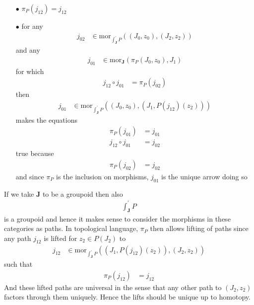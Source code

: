 \begin{enumerate}
\item[$\bullet$]
$\pi_{P}(j_{12}) = j_{12}$
\item[$\bullet$]
for any
\begin{align*}
  j_{02}
  &\in
  \mathrm{mor}_{\int_{\mathbf{J}}^{\prime}P}
  \left(
    (J_{0},z_{0}),
    (J_{2},z_{2})
  \right)
\end{align*}
and any
\begin{align*}
  j_{01}
  &\in
  \mathrm{mor}_{\mathbf{J}}
  \left(
    \pi_{P}(J_{0},z_{0}),
    J_{1}
  \right)
\end{align*}
for which
\begin{align*}
  j_{12}
  \circ
  j_{01}
  &=
  \pi_{P}(j_{02})
\end{align*}
then
\begin{align*}
  j_{01}
  &\in
  \mathrm{mor}_{\int_{\mathbf{J}}^{\prime}P}
  \left(
    (J_{0},z_{0}),
    (J_{1},P(j_{12})(z_{2}))
  \right)
\end{align*}
makes the equations
\begin{align*}
  \pi_{P}(j_{01})
  &=
  j_{01}
  \\
  j_{12}
  \circ
  j_{01}
  &=
  j_{02}
\end{align*}
true because
\begin{align*}
  \pi_{P}(j_{02})
  &=
  j_{02}
\end{align*}
and since $\pi_{P}$ is the inclusion on morphisms, $j_{01}$ is the unique arrow doing so
\end{enumerate}
If we take $\mathbf{J}$ to be a groupoid then also
\begin{align*}
  \int_{\mathbf{J}}^{\prime}
  P
\end{align*}
is a groupoid and hence it makes sense to consider the morphisms in these categories as paths. In topological language, $\pi_{P}$ then allows lifting of paths since any path $j_{12}$ is {\glqq}lifted{\grqq} for $z_{2} \in P(J_{2})$ to
\begin{align*}
  j_{12}
  &\in
  \mathrm{mor}_{\int_{\mathbf{J}}^{\prime}P}
  \left(
    \left(
      J_{1},
      P(j_{12})(z_{2})
    \right),
    (J_{2},z_{2})
  \right)
\end{align*}
such that
\begin{align*}
  \pi_{P}(j_{12})
  &=
  j_{12}
\end{align*}
And these lifted paths are universal in the sense that any other path to $(J_{2},z_{2})$ factors through them uniquely. Hence the lifts should be unique up to homotopy.
